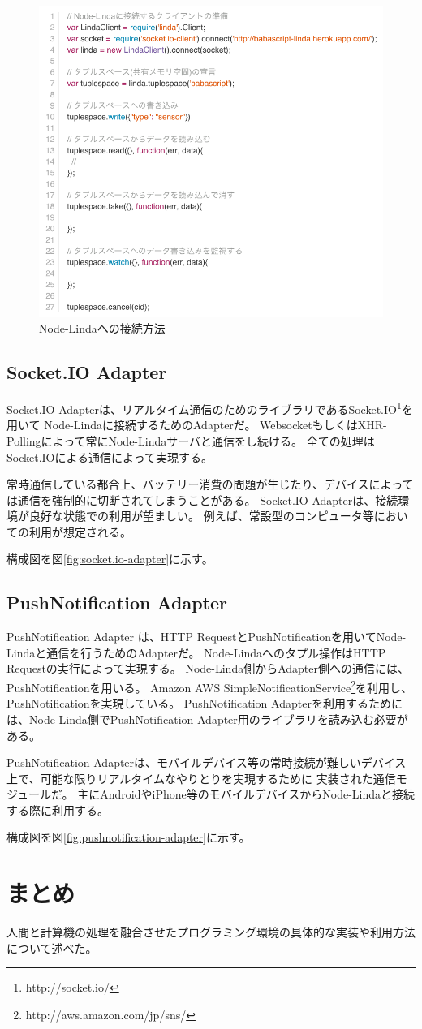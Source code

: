 \begin{figure}[htbp]
  \begin{center}
    \includegraphics[width=.7\linewidth,bb=0 0 770 695]{images/linda-usage.js.png}
  \end{center}
  \caption{Node-Lindaへの接続方法}
  \label{fig:linda-usage}
\end{figure}

\subsection{Socket.IO Adapter}\label{socket.io-adapter}

Socket.IO
Adapterは、リアルタイム通信のためのライブラリであるSocket.IO\footnote{http://socket.io/}を用いて
Node-Lindaに接続するためのAdapterだ。
WebsocketもしくはXHR-Pollingによって常にNode-Lindaサーバと通信をし続ける。
全ての処理はSocket.IOによる通信によって実現する。

常時通信している都合上、バッテリー消費の問題が生じたり、デバイスによっては通信を強制的に切断されてしまうことがある。
Socket.IO Adapterは、接続環境が良好な状態での利用が望ましい。
例えば、常設型のコンピュータ等においての利用が想定される。

構成図を図\ref{fig:socket.io-adapter}に示す。

\subsection{PushNotification Adapter}\label{pushnotification-adapter}

PushNotification Adapter は、HTTP
RequestとPushNotificationを用いてNode-Lindaと通信を行うためのAdapterだ。
Node-Lindaへのタプル操作はHTTP Requestの実行によって実現する。
Node-Linda側からAdapter側への通信には、PushNotificationを用いる。 Amazon
AWS
SimpleNotificationService\footnote{http://aws.amazon.com/jp/sns/}を利用し、
PushNotificationを実現している。 PushNotification
Adapterを利用するためには、Node-Linda側でPushNotification
Adapter用のライブラリを読み込む必要がある。

PushNotification
Adapterは、モバイルデバイス等の常時接続が難しいデバイス上で、可能な限りリアルタイムなやりとりを実現するために
実装された通信モジュールだ。
主にAndroidやiPhone等のモバイルデバイスからNode-Lindaと接続する際に利用する。

構成図を図\ref{fig:pushnotification-adapter}に示す。

\section{まとめ}\label{ux307eux3068ux3081}

人間と計算機の処理を融合させたプログラミング環境の具体的な実装や利用方法について述べた。
